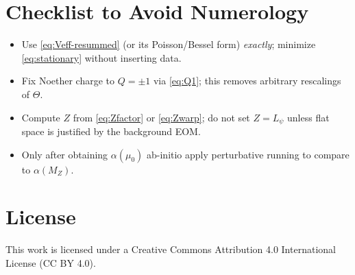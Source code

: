 \documentclass[12pt]{article}
\begin{document}
\section{Checklist to Avoid Numerology}
\begin{itemize}
\item Use \eqref{eq:Veff-resummed} (or its Poisson/Bessel form) \emph{exactly}; minimize \eqref{eq:stationary} without inserting data.
\item Fix Noether charge to $Q=\pm 1$ via \eqref{eq:Q1}; this removes arbitrary rescalings of $\Theta$.
\item Compute $Z$ from \eqref{eq:Zfactor} or \eqref{eq:Zwarp}; do not set $Z=L_\psi$ unless flat space is justified by the background EOM.
\item Only after obtaining $\alpha(\mu_0)$ ab-initio apply perturbative running to compare to $\alpha(M_Z)$.
\end{itemize}


\section*{License}
This work is licensed under a Creative Commons Attribution 4.0 International License (CC BY 4.0).
\end{document}
